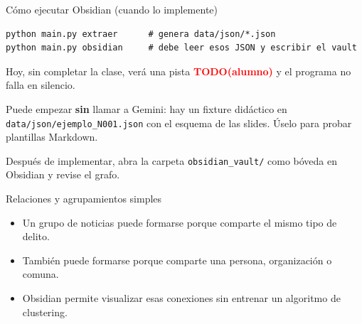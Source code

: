\documentclass[11pt,aspectratio=169]{beamer}
\newcommand{\todo}{\textcolor{red}{\textbf{TODO(alumno)}}}
\newcommand{\code}[1]{\texttt{#1}}
\begin{document}
\begin{frame}[fragile]{Cómo ejecutar Obsidian (cuando lo implemente)}
\tiny
\begin{lstlisting}
python main.py extraer      # genera data/json/*.json
python main.py obsidian     # debe leer esos JSON y escribir el vault
\end{lstlisting}

\vspace{0.15cm}
\footnotesize
Hoy, sin completar la clase, verá una pista \todo{} y el programa no falla en silencio.

\vspace{0.2cm}
Puede empezar \textbf{sin} llamar a Gemini: hay un fixture didáctico en \code{data/json/ejemplo\_N001.json} con el esquema de las slides. Úselo para probar plantillas Markdown.

\vspace{0.15cm}
Después de implementar, abra la carpeta \code{obsidian\_vault/} como bóveda en Obsidian y revise el grafo.
\end{frame}

\begin{frame}{Relaciones y agrupamientos simples}
\small
\begin{itemize}[<+->]
\item Un grupo de noticias puede formarse porque comparte el mismo tipo de delito.
\item También puede formarse porque comparte una persona, organización o comuna.
\item Obsidian permite visualizar esas conexiones sin entrenar un algoritmo de clustering.
\end{itemize}

\begin{center}
\end{center}
\end{frame}
\end{document}
